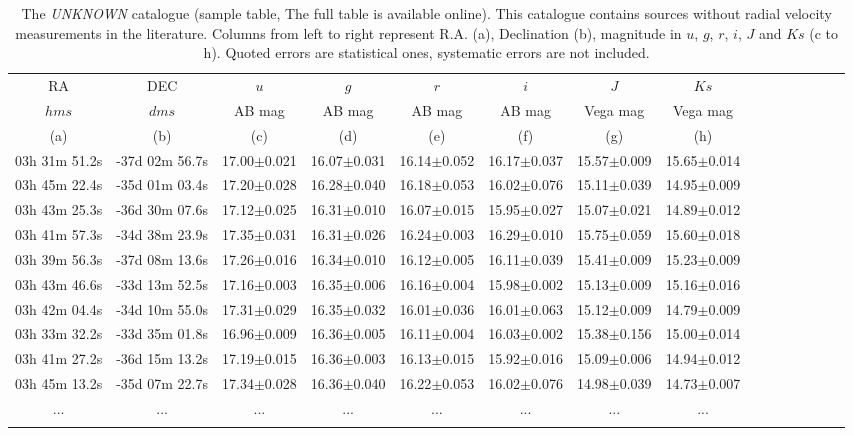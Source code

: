 \documentclass[fleqn,usenatbib]{mnras}
\begin{document}
\begin{table*}
\caption{The \textit{UNKNOWN} catalogue (sample table, The full table is available online). This catalogue contains sources without radial velocity measurements in the literature. Columns from left to right represent R.A. (a), Declination (b), magnitude in $u$, $g$, $r$, $i$, $J$ and $Ks$ (c to h). Quoted errors are statistical ones, systematic errors are not included.}
\begin{tabular}{ ccccccccccccccc } \hline  
RA & DEC & $u$ & $g$ & $r$ & $i$ & $J$ & $Ks$ \\
$hms$ & $dms$ & AB mag & AB mag & AB mag & AB mag & Vega mag & Vega mag \\
(a) & (b) &  (c) &  (d) &  (e) &  (f) &  (g)  &  (h)\\
\hline
03h 31m 51.2s & -37d 02m 56.7s & 17.00$\pm$0.021 & 16.07$\pm$0.031 & 16.14$\pm$0.052 & 16.17$\pm$0.037 & 15.57$\pm$0.009 & 15.65$\pm$0.014  \\
03h 45m 22.4s & -35d 01m 03.4s & 17.20$\pm$0.028 & 16.28$\pm$0.040 & 16.18$\pm$0.053 & 16.02$\pm$0.076 & 15.11$\pm$0.039 & 14.95$\pm$0.009  \\
03h 43m 25.3s & -36d 30m 07.6s & 17.12$\pm$0.025 & 16.31$\pm$0.010 & 16.07$\pm$0.015 & 15.95$\pm$0.027 & 15.07$\pm$0.021 & 14.89$\pm$0.012  \\
03h 41m 57.3s & -34d 38m 23.9s & 17.35$\pm$0.031 & 16.31$\pm$0.026 & 16.24$\pm$0.003 & 16.29$\pm$0.010 & 15.75$\pm$0.059 & 15.60$\pm$0.018  \\
03h 39m 56.3s & -37d 08m 13.6s & 17.26$\pm$0.016 & 16.34$\pm$0.010 & 16.12$\pm$0.005 & 16.11$\pm$0.039 & 15.41$\pm$0.009 & 15.23$\pm$0.009  \\
03h 43m 46.6s & -33d 13m 52.5s & 17.16$\pm$0.003 & 16.35$\pm$0.006 & 16.16$\pm$0.004 & 15.98$\pm$0.002 & 15.13$\pm$0.009 & 15.16$\pm$0.016  \\
03h 42m 04.4s & -34d 10m 55.0s & 17.31$\pm$0.029 & 16.35$\pm$0.032 & 16.01$\pm$0.036 & 16.01$\pm$0.063 & 15.12$\pm$0.009 & 14.79$\pm$0.009  \\
03h 33m 32.2s & -33d 35m 01.8s & 16.96$\pm$0.009 & 16.36$\pm$0.005 & 16.11$\pm$0.004 & 16.03$\pm$0.002 & 15.38$\pm$0.156 & 15.00$\pm$0.014  \\
03h 41m 27.2s & -36d 15m 13.2s & 17.19$\pm$0.015 & 16.36$\pm$0.003 & 16.13$\pm$0.015 & 15.92$\pm$0.016 & 15.09$\pm$0.006 & 14.94$\pm$0.012  \\
03h 45m 13.2s & -35d 07m 22.7s & 17.34$\pm$0.028 & 16.36$\pm$0.040 & 16.22$\pm$0.053 & 16.02$\pm$0.076 & 14.98$\pm$0.039 & 14.73$\pm$0.007  \\


... & ... & ... & ... & ... & ... & ... & ... \\
\hline
\label{unk}
\end{tabular}
\end{table*}
\end{document}

